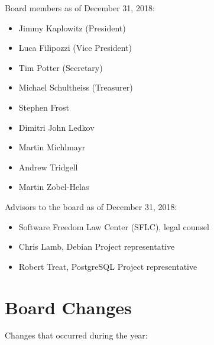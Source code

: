 \documentclass[a4paper]{report}
\begin{document}
Board members as of December 31, 2018:

\begin{itemize}
\item Jimmy Kaplowitz (President)
\item Luca Filipozzi (Vice President)
\item Tim Potter (Secretary)
\item Michael Schultheiss (Treasurer)
\item Stephen Frost
\item Dimitri John Ledkov
\item Martin Michlmayr
\item Andrew Tridgell
\item Martin Zobel-Helas
\end{itemize}

Advisors to the board as of December 31, 2018:

\begin{itemize}
\item Software Freedom Law Center (SFLC), legal counsel
\item Chris Lamb, Debian Project representative
\item Robert Treat, PostgreSQL Project representative
\end{itemize}

\section{Board Changes}

Changes that occurred during the year:
\end{document}
